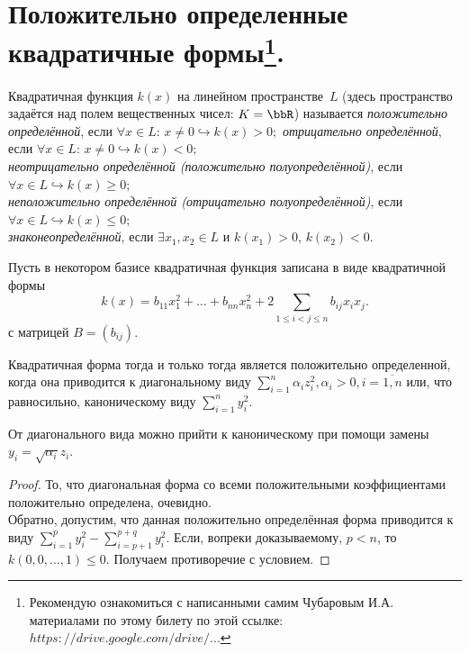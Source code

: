 \section[Положительно определенные квадратичные формы.]{Положительно определенные квадратичные формы\footnote{Рекомендую ознакомиться с написанными самим Чубаровым И.А. материалами по этому билету по этой ссылке: \href{https://drive.google.com/drive/u/0/folders/0BzuzEyNkpwYDcFhhV1l2N1lhY2s}{$https://drive.google.com/drive/...$}}. }
  \begin{defn}
  Квадратичная функция $k(x)$ на линейном пространстве~$L$ (здесь пространство задаётся над полем вещественных чисел: $K=\bbR$) называется \textit{положительно определённой}, если $\forall x \in L$: $x \neq 0 \hookrightarrow k(x)>0;$ \textit{отрицательно определённой}, если $\forall x \in L$: $x \neq 0 \hookrightarrow k(x)<0;$ \\
\textit{неотрицательно определённой (положительно полуопределённой)}, если $\forall x \in L \hookrightarrow k(x)\ge 0;$ \\
\textit{неположительно определённой (отрицательно полуопределённой)}, если $\forall x \in L \hookrightarrow k(x)\le 0;$ \\
\textit{знаконеопределённой}, если $\exists x_1,x_2 \in L$ и $k(x_1)>0$, $k(x_2)<0.$ \\
  \end{defn}
  Пусть в некотором базисе квадратичная функция записана в виде квадратичной формы
  \begin{equation}\label{25.1.common}
  k(x)=b_{11}x_1^2+\ldots+b_{nn}x_n^2+2\sum\limits_{1\le i<j\le n} b_{ij}x_ix_j.
  \end{equation}
с матрицей $B=(b_{ij})$.
  \begin{lemm}\label{25.1.lemm}
  Квадратичная форма тогда и только тогда является положительно определенной, когда она приводится к диагональному виду $\sum\limits_{i=1}^n\alpha_iz_i^2, \alpha_i>0, i=\overline{1,n}$ или, что равносильно, каноническому виду $\sum\limits_{i=1}^ny_i^2$.
  \end{lemm}
  \begin{notion}
  От диагонального вида можно прийти к каноническому при помощи замены $y_i=\sqrt{\alpha_i}z_i$.
  \end{notion}
  \begin{proof}
  То, что диагональная форма со всеми положительными коэффициентами положительно определена, очевидно. \\
  Обратно, допустим, что данная положительно определённая форма приводится к виду $\sum\limits_{i=1}^py_i^2-\sum\limits_{i=p+1}^{p+q}y_i^2$. Если, вопреки доказываемому, $p<n$, то $k(0,0,...,1)\le 0$. Получаем противоречие с условием.
  \end{proof}
